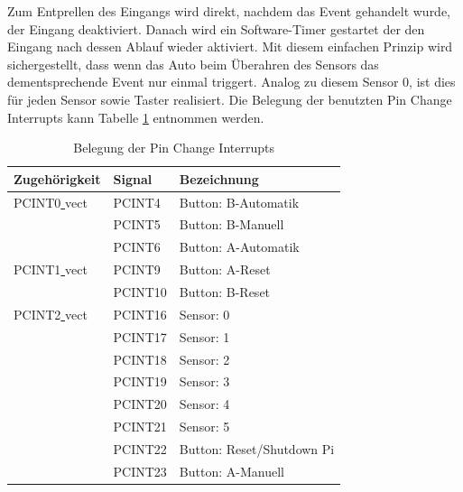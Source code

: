 \documentclass[a4paper, 11pt]{report}
\begin{document}
			Zum Entprellen des Eingangs wird direkt, nachdem das Event gehandelt wurde, der Eingang deaktiviert. Danach wird ein Software-Timer gestartet der den Eingang nach dessen Ablauf wieder aktiviert. Mit diesem einfachen Prinzip wird sichergestellt, dass wenn das Auto beim Überahren des Sensors das dementsprechende Event nur einmal triggert.
			Analog zu diesem Sensor 0, ist dies für jeden Sensor sowie Taster realisiert. Die Belegung der benutzten Pin Change Interrupts kann Tabelle \ref{tab:belegungpcint} entnommen werden.
			\begin{table}[ht]
				\begin{tabular}{|l|l|l|}
					\hline
					Zugehörigkeit & Signal & Bezeichnung\\
					\hline
					\hline
					PCINT0\underline{ }vect & PCINT4 & Button: B-Automatik\\
					\hline
											& PCINT5 & Button: B-Manuell\\
					\hline
											& PCINT6 & Button: A-Automatik\\
					\hline
					\hline
					PCINT1\underline{ }vect & PCINT9 & Button: A-Reset\\
					\hline
											& PCINT10 & Button: B-Reset\\
					\hline
					\hline
					PCINT2\underline{ }vect & PCINT16 & Sensor: 0\\
					\hline
											& PCINT17 & Sensor: 1\\
					\hline
											& PCINT18 & Sensor: 2\\
					\hline
											& PCINT19 & Sensor: 3\\
					\hline
											& PCINT20 & Sensor: 4\\
					\hline
											& PCINT21 & Sensor: 5\\
					\hline
											& PCINT22 & Button: Reset/Shutdown Pi\\
					\hline
											& PCINT23 & Button: A-Manuell\\
					\hline
				\end{tabular}
				\caption{Belegung der Pin Change Interrupts}
				\label{tab:belegungpcint}
			\end{table}
\end{document}
